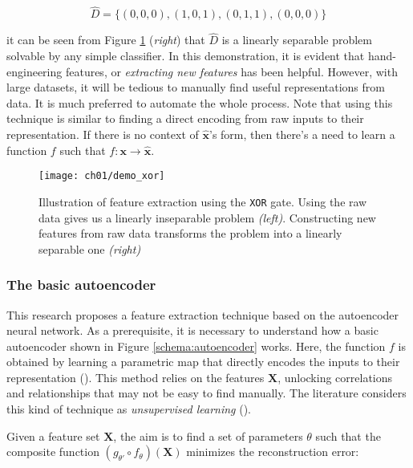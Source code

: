 \[
    \widehat{D} = \{(0,0,0), (1,0,1), (0,1,1), (0,0,0)\}
\]

\noindent it can be seen from Figure \ref{demo:xor} (\textit{right}) that 
$\widehat{D}$ is a linearly separable problem solvable by any simple classifier.
In this demonstration, it is evident that hand-engineering features, or
\textit{extracting new features} has been helpful. However, with large
datasets, it will be tedious to manually find useful representations from data.
It is much preferred to automate the whole process. Note that  using this
technique is similar to finding a direct encoding from raw inputs to their 
representation. If there is no context of $\mathbf{\widehat{x}}$'s form, then
there's a need to learn a function $f$ such that $f: \mathbf{x} \rightarrow 
\mathbf{\widehat{x}}$.

\begin{figure}[!b]
  \centering
  \texttt{[image: ch01/demo\_xor]}
  \caption[Illustration of feature extraction using the \texttt{XOR} gate]{
      Illustration of feature extraction using the \texttt{XOR} gate. Using the
      raw data gives us a linearly inseparable problem \textit{(left)}.
      Constructing new features from raw data transforms the problem into a
      linearly separable one \textit{(right)}
  }
  \label{demo:xor}
\end{figure}

\subsubsection{The basic autoencoder}


\par This research proposes a feature extraction technique based on the
autoencoder neural network. As a prerequisite, it is necessary to understand
how a basic autoencoder shown in Figure \ref{schema:autoencoder} works.
Here, the function $f$ is obtained by learning a parametric map that directly
encodes the inputs to their representation (\cite{hinton1994autoencoders}).
This method relies on the features $\mathbf{X}$, unlocking correlations and 
relationships that may not be easy to find manually. The literature considers
this kind of technique as \textit{unsupervised learning} 
(\cite{bengio2013representation}).

\par Given a feature set $\mathbf{X}$, the aim is to find a set of parameters
$\theta$ such that the composite function $(g_{\theta'} \circ f_{\theta})
(\mathbf{X})$ minimizes the reconstruction error:

